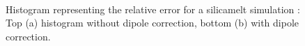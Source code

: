 \documentclass[10pt,twoside,a4paper]{report}
\begin{document}
\begin{figure}[H]
  \label{fig:histogram}
    \centering  
 \\    
  
    \caption{Histogram representing the relative error for a silicamelt simulation : Top (a) histogram without dipole correction, bottom (b) with dipole correction.}    
   \end{figure}   
\end{document}
